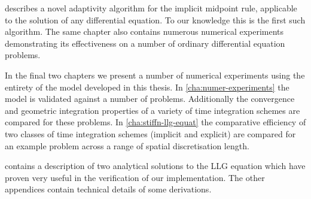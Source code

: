  describes a novel adaptivity algorithm for the implicit midpoint rule, applicable to the solution of any differential equation.
To our knowledge this is the first such algorithm.
The same chapter also contains numerous numerical experiments demonstrating its effectiveness on a number of ordinary differential equation problems.

In the final two chapters we present a number of numerical experiments using the entirety of the model developed in this thesis.
In \cref{cha:numer-experiments} the model is validated against a number of problems.
Additionally the convergence and geometric integration properties of a variety of time integration schemes are compared for these problems.
In \cref{cha:stiffn-llg-equat} the comparative efficiency of two classes of time integration schemes (implicit and explicit) are compared for an example problem across a range of spatial discretisation length.

 contains a description of two analytical solutions to the LLG equation which have proven very useful in the verification of our implementation.
The other appendices contain technical details of some derivations.


